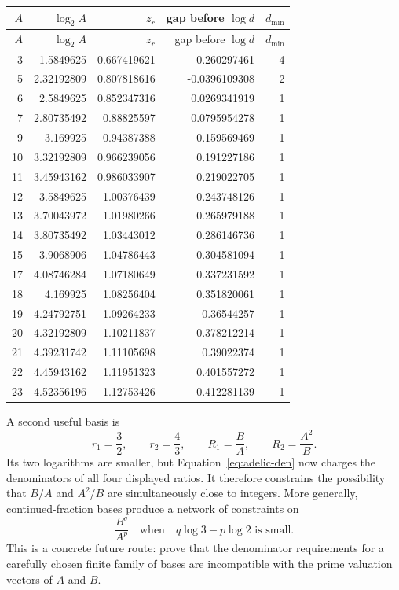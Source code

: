 \documentclass[11pt]{article}
\theoremstyle{definition}
\begin{document}
\begin{center}
\begin{longtable}{rrrrr}
\toprule
$A$ & $\log_2A$ & $z_r$ & gap before $\log d$ & $d_{\min}$ \\
\midrule
\endfirsthead
\toprule
$A$ & $\log_2A$ & $z_r$ & gap before $\log d$ & $d_{\min}$ \\
\midrule
\endhead
3 & 1.5849625 & 0.667419621 & -0.260297461 & 4 \\
5 & 2.32192809 & 0.807818616 & -0.0396109308 & 2 \\
6 & 2.5849625 & 0.852347316 & 0.0269341919 & 1 \\
7 & 2.80735492 & 0.88825597 & 0.0795954278 & 1 \\
9 & 3.169925 & 0.94387388 & 0.159569469 & 1 \\
10 & 3.32192809 & 0.966239056 & 0.191227186 & 1 \\
11 & 3.45943162 & 0.986033907 & 0.219022705 & 1 \\
12 & 3.5849625 & 1.00376439 & 0.243748126 & 1 \\
13 & 3.70043972 & 1.01980266 & 0.265979188 & 1 \\
14 & 3.80735492 & 1.03443012 & 0.286146736 & 1 \\
15 & 3.9068906 & 1.04786443 & 0.304581094 & 1 \\
17 & 4.08746284 & 1.07180649 & 0.337231592 & 1 \\
18 & 4.169925 & 1.08256404 & 0.351820061 & 1 \\
19 & 4.24792751 & 1.09264233 & 0.36544257 & 1 \\
20 & 4.32192809 & 1.10211837 & 0.378212214 & 1 \\
21 & 4.39231742 & 1.11105698 & 0.39022374 & 1 \\
22 & 4.45943162 & 1.11951323 & 0.401557272 & 1 \\
23 & 4.52356196 & 1.12753426 & 0.412281139 & 1 \\
\bottomrule
\end{longtable}
\end{center}

A second useful basis is
\[
 r_1=\frac32,\qquad r_2=\frac43,
 \qquad R_1=\frac BA,\qquad R_2=\frac{A^2}{B}.
\]
Its two logarithms are smaller, but Equation~\eqref{eq:adelic-den} now charges
the denominators of all four displayed ratios.  It therefore constrains the
possibility that $B/A$ and $A^2/B$ are simultaneously close to integers.  More
generally, continued-fraction bases produce a network of constraints on
\[
 \frac{B^q}{A^p}
 \quad\text{when}\quad q\log3-p\log2\text{ is small}.
\]
This is a concrete future route: prove that the denominator requirements for a
carefully chosen finite family of bases are incompatible with the prime
valuation vectors of $A$ and $B$.
\end{document}

